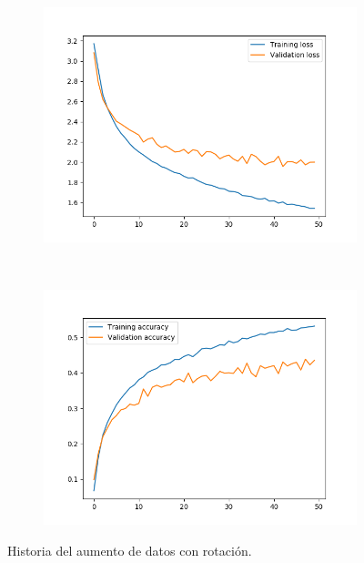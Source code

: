 \documentclass[11pt,a4paper]{article}
\begin{document}
\begin{figure}[H]
  \begin{subfigure}{.5\textwidth}
    \centering
    \includegraphics[scale=0.4]{img/aug-rot-loss.png}
    \label{fig:aug-rot-loss}
  \end{subfigure}%
  ~ \quad
  \begin{subfigure}{.5\textwidth}
    \centering
    \includegraphics[scale=0.4]{img/aug-rot-acc.png}
    \label{fig:aug-rot-acc}
  \end{subfigure}
  \caption{Historia del aumento de datos con rotación.}
  \label{fig:history-aug-rot}
\end{figure}
\end{document}
